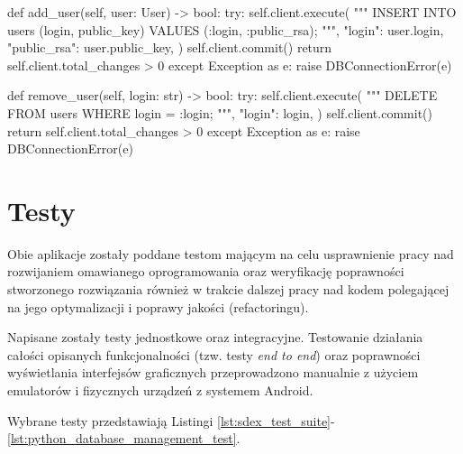 \documentclass[../main.tex]{subfiles}
\begin{document}
\begin{mypython}[caption={Implementacja menadżera bazy danych},label={lst:python_database_management}]
    def add_user(self, user: User) -> bool:
        try:
            self.client.execute(
                """
                INSERT INTO users (login, public_key)
                VALUES (:login, :public_rsa);
                """,
                {"login": user.login, "public_rsa": user.public_key},
            )
            self.client.commit()
            return self.client.total_changes > 0
        except Exception as e:
            raise DBConnectionError(e)

    def remove_user(self, login: str) -> bool:
        try:
            self.client.execute(
                """
                DELETE FROM
                    users
                WHERE
                    login = :login;
                """,
                {"login": login},
            )
            self.client.commit()
            return self.client.total_changes > 0
        except Exception as e:
            raise DBConnectionError(e)
\end{mypython}

\section{Testy}

Obie aplikacje zostały poddane testom mającym na celu usprawnienie pracy nad rozwijaniem omawianego oprogramowania oraz weryfikację poprawności stworzonego rozwiązania również w trakcie dalszej pracy nad kodem polegającej na jego optymalizacji i poprawy jakości (refactoringu).

Napisane zostały testy jednostkowe oraz integracyjne. Testowanie działania całości opisanych funkcjonalności (tzw. testy \textit{end to end}) oraz poprawności wyświetlania interfejsów graficznych przeprowadzono manualnie z użyciem emulatorów i fizycznych urządzeń z systemem Android.

Wybrane testy przedstawiają Listingi \ref{lst:sdex_test_suite}-\ref{lst:python_database_management_test}.
\end{document}
